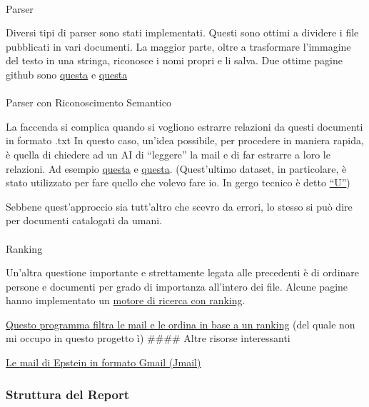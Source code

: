 \documentclass[
  italian,
  a4paper,
]{article}
\makeatletter
\let\oldparagraph\paragraph
\renewcommand{\paragraph}{
    \@ifstar
      \xxxParagraphStar
      \xxxParagraphNoStar
  }
\newcommand{\xxxParagraphStar}[1]{\oldparagraph*{#1}\mbox{}}
\newcommand{\xxxParagraphNoStar}[1]{\oldparagraph{#1}\mbox{}}
\makeatother
\begin{document}
\paragraph{Parser}\label{parser}

Diversi tipi di parser sono stati implementati. Questi sono ottimi a
dividere i file pubblicati in vari documenti. La maggior parte, oltre a
trasformare l'immagine del testo in una stringa, riconosce i nomi propri
e li salva. Due ottime pagine github sono
\href{https://github.com/markramm/EpsteinFiles}{questa} e
\href{https://github.com/actuallyrizzn/epstein-browser}{questa}

\paragraph{Parser con Riconoscimento
Semantico}\label{parser-con-riconoscimento-semantico}

La faccenda si complica quando si vogliono estrarre relazioni da questi
documenti in formato .txt In questo caso, un'idea possibile, per
procedere in maniera rapida, è quella di chiedere ad un AI di
``leggere'' la mail e di far estrarre a loro le relazioni. Ad esempio
\href{https://github.com/epstein-docs/epstein-docs.github.io}{questa} e
\href{https://github.com/maxandrews/Epstein-doc-explorer}{questa}.
(Quest'ultimo dataset, in particolare, è stato utilizzato per fare
quello che volevo fare io. In gergo tecnico è detto
\href{https://epsteinvisualizer.com/}{``U''})

Sebbene quest'approccio sia tutt'altro che scevro da errori, lo stesso
si può dire per documenti catalogati da umani.

\paragraph{Ranking}\label{ranking}

Un'altra questione importante e strettamente legata alle precedenti è di
ordinare persone e documenti per grado di importanza all'intero dei
file. Alcune pagine hanno implementato un
\href{https://github.com/latent-variable/epstein-ranker}{motore di
ricerca con ranking}.

\href{}{Questo programma filtra le mail e le ordina in base a un
ranking} (del quale non mi occupo in questo progetto ì) \#\#\#\# Altre
risorse interessanti

\href{https://jmail.world}{Le mail di Epstein in formato Gmail (Jmail)}

\subsubsection{Struttura del Report}\label{struttura-del-report}
\end{document}
